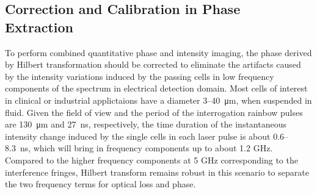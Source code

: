\documentclass[aps,pra,reprint,superscriptaddress]{revtex4-1}
\begin{document}
\subsection{Correction and Calibration in Phase Extraction}

To perform combined quantitative phase and intensity imaging, the phase derived by Hilbert transformation should be corrected to eliminate the artifacts caused by the intensity variations induced by the passing cells in low frequency components of the spectrum in electrical detection domain. Most cells of interest in clinical or industrial applictaions have a diameter 3--\SI{40}{\micro\meter}, when suspended in fluid. Given the field of view and the period of the interrogation rainbow pulses are \SI{130}{\micro\meter} and \SI{27}{\nano\second}, respectively, the time duration of the instantaneous intensity change induced by the single cells in each laser pulse is about 0.6--\SI{8.3}{\nano\second}, which will bring in frequency components up to about 1.2 GHz. Compared to the higher frequency components at 5 GHz corresponding to the interference fringes, Hilbert transform remains robust in this scenario to separate the two frequency terms for optical loss and phase. 
\end{document}
